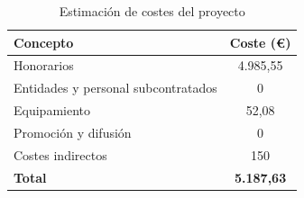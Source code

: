 \begin{table}[h]
\centering
{}

\begin{tabular}{lc}
\toprule
\rowcolor{grisfila}
\textbf{Concepto} & \textbf{Coste (€)} \\
\midrule
Honorarios & 4.985,55 \\
Entidades y personal subcontratados & 0 \\
Equipamiento & 52,08 \\
Promoción y difusión & 0\\
Costes indirectos & 150 \\
\midrule
\textbf{Total} & \textbf{5.187,63} \\
\bottomrule
\end{tabular}

\caption{Estimación de costes del proyecto}
\label{tab:presupuestototal}
\end{table}